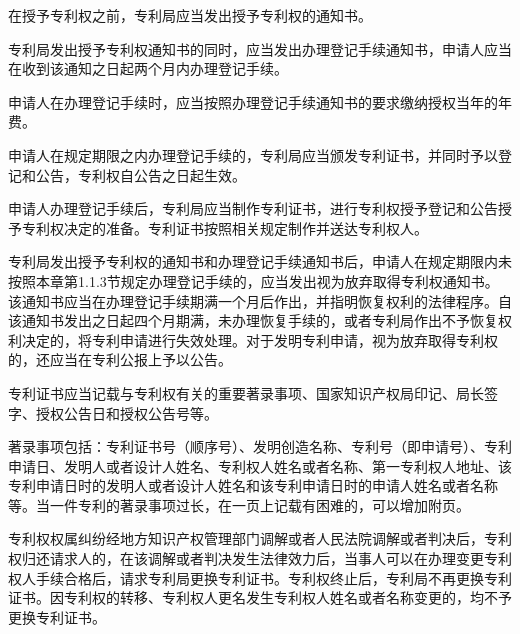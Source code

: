{\setlength{\parindent}{22.2bp}在授予专利权之前，专利局应当发出授予专利权的通知书。\par}

专利局发出授予专利权通知书的同时，应当发出办理登记手续通知书，申请人应当在收到该通知之日起两个月内办理登记手续。

申请人在办理登记手续时，应当按照办理登记手续通知书的要求缴纳授权当年的年费。

申请人在规定期限之内办理登记手续的，专利局应当颁发专利证书，并同时予以登记和公告，专利权自公告之日起生效。

申请人办理登记手续后，专利局应当制作专利证书，进行专利权授予登记和公告授予专利权决定的准备。专利证书按照相关规定制作并送达专利权人。

专利局发出授予专利权的通知书和办理登记手续通知书后，申请人在规定期限内未按照本章第1.1.3节规定办理登记手续的，应当发出视为放弃取得专利权通知书。该通知书应当在办理登记手续期满一个月后作出，并指明恢复权利的法律程序。自该通知书发出之日起四个月期满，未办理恢复手续的，或者专利局作出不予恢复权利决定的，将专利申请进行失效处理。对于发明专利申请，视为放弃取得专利权的，还应当在专利公报上予以公告。

专利证书应当记载与专利权有关的重要著录事项、国家知识产权局印记、局长签字、授权公告日和授权公告号等。

著录事项包括：专利证书号（顺序号）、发明创造名称、专利号（即申请号）、专利申请日、发明人或者设计人姓名、专利权人姓名或者名称、第一专利权人地址、该专利申请日时的发明人或者设计人姓名和该专利申请日时的申请人姓名或者名称等。当一件专利的著录事项过长，在一页上记载有困难的，可以增加附页。


专利权权属纠纷经地方知识产权管理部门调解或者人民法院调解或者判决后，专利权归还请求人的，在该调解或者判决发生法律效力后，当事人可以在办理变更专利权人手续合格后，请求专利局更换专利证书。专利权终止后，专利局不再更换专利证书。因专利权的转移、专利权人更名发生专利权人姓名或者名称变更的，均不予更换专利证书。


